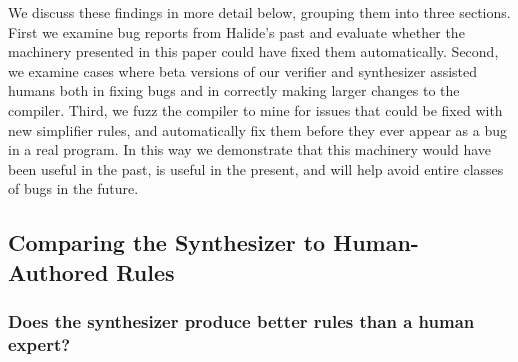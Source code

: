 \documentclass[acmsmall]{acmart}\settopmatter{}
\newcommand{\jln}[1]{\textcolor{uwpurple}{\textit{[{#1} --JLN]}}}
\begin{document}
We discuss these findings in more detail below, grouping them into three sections. First we examine bug reports from Halide’s past and evaluate whether the machinery presented in this paper could have fixed them automatically. Second, we examine cases where beta versions of our verifier and synthesizer assisted humans both in fixing bugs and in correctly making larger changes to the compiler. Third, we fuzz the compiler to mine for issues that could be fixed with new simplifier rules, and automatically fix them before they ever appear as a bug in a real program. In this way we demonstrate that this machinery would have been useful in the past, is useful in the present, and will help avoid entire classes of bugs in the future.


\subsection{Comparing the Synthesizer to Human-Authored Rules}

\subsubsection{Does the synthesizer produce better rules than a human expert?}
\label{sub:bugfixes}



\end{document}
